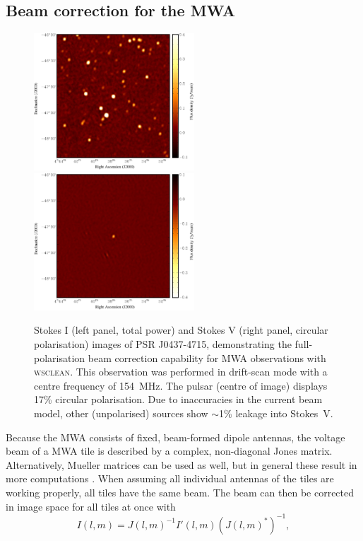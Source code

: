 \documentclass[useAMS,usenatbib]{mn2e}
\begin{document}
\subsection{Beam correction for the MWA}
\begin{figure}
\begin{center}
\includegraphics[width=6cm]{img/pulsar-stokesi}\hspace{1cm}\includegraphics[width=6cm]{img/pulsar-stokesv}
\caption{Stokes I (left panel, total power) and Stokes V (right panel, circular polarisation) images of PSR J0437-4715, demonstrating the full-polarisation beam correction capability for MWA observations with \textsc{wsclean}. This observation was performed in drift-scan mode with a centre frequency of 154~MHz. The pulsar (centre of image) displays 17\% circular polarisation. Due to inaccuracies in the current beam model, other (unpolarised) sources show $\sim$1\% leakage into Stokes~V.}
\label{fig:pulsar-stokes-iv}
\end{center}
\end{figure}
Because the MWA consists of fixed, beam-formed dipole antennas, the voltage beam of a MWA tile is described by a complex, non-diagonal Jones matrix. Alternatively, Mueller matrices can be used as well, but in general these result in more computations \citep{revisiting-me-i}. When assuming all individual antennas of the tiles are working properly, all tiles have the same beam. The beam can then be corrected in image space for all tiles at once with
\begin{equation}\label{eq:beam-correction}
 I(l, m) = J(l,m)^{-1} I'(l, m) \left(J(l,m)^*\right)^{-1},
\end{equation}
\end{document}
